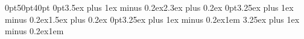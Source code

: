\titlespacing*{\chapter}      {0pt}{50pt}{40pt}
\titlespacing*{\section}      {0pt}{3.5ex plus 1ex minus 0.2ex}{2.3ex plus 0.2ex}
\titlespacing*{\subsection}   {0pt}{3.25ex plus 1ex minus 0.2ex}{1.5ex plus 0.2ex}
\titlespacing*{\paragraph}   {0pt}{3.25ex plus 1ex minus 0.2ex}{1em}
\titlespacing*{\subparagraph} {\parindent}{3.25ex plus 1ex minus 0.2ex}{1em}

\newcommand{\chapters}[1]{\begin{advanced}\chapter{#1}\end{advanced}}
\newcommand{\sections}[1]{\begin{advanced}\section{#1}\end{advanced}}
\newcommand{\subsections}[1]{\begin{advanced}\subsection{#1}\end{advanced}}
\newcommand{\subsubsections}[1]{\begin{advanced}\subsubsection{#1}\end{advanced}}

